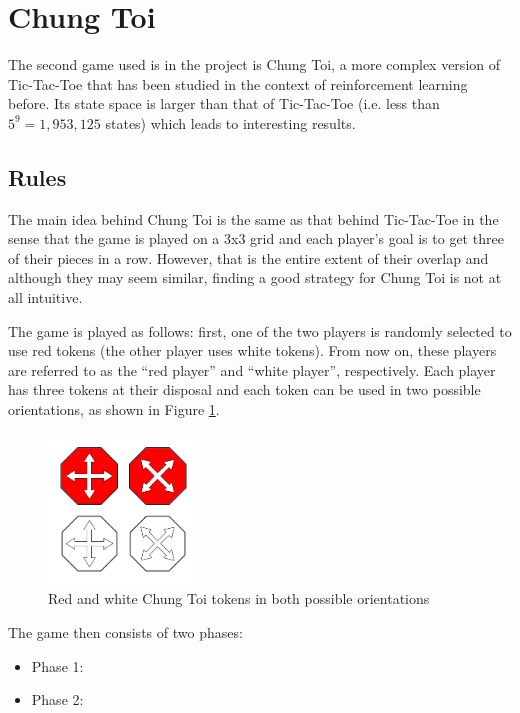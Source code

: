 \documentclass[11pt,a4paper]{report}
\begin{document}
\section{Chung Toi}

The second game used is in the project is Chung Toi,  a more complex version of Tic-Tac-Toe that has been studied in the context of reinforcement learning before. Its state space is larger than that of Tic-Tac-Toe (i.e. less than $5^9 = 1,953,125$ states) which leads to interesting results.


\subsection{Rules}

The main idea behind Chung Toi is the same as that behind Tic-Tac-Toe in the sense that the game is played on a 3x3 grid and each player's goal is to get three of their pieces in a row. However, that is the entire extent of their overlap and although they may seem similar, finding a good strategy for Chung Toi is not at all intuitive.

The game is played as follows: first, one of the two players is randomly selected to use red tokens (the other player uses white tokens). From now on, these players are referred to as the ``red player'' and ``white player'', respectively. Each player has three tokens at their disposal and each token can be used in two possible orientations, as shown in Figure \ref{chung-toi-tokens}.

\begin{figure}[htbp]
	\begin{center}
		\includegraphics[width=40mm]{chung_toi_tokens.png}
		\caption[Chung Toi tokens]{Red and white Chung Toi tokens in both possible orientations}\label{chung-toi-tokens}
	\end{center}
\end{figure}

The game then consists of two phases:

\begin{itemize}
	\item Phase 1: 
	\item Phase 2:
\end{itemize}
\end{document}
